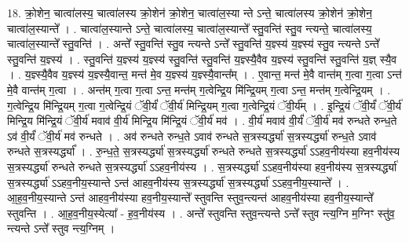 \documentclass[17pt]{extarticle}
\begin{document}
18. क्रो॒शेन॒ चात्वा॑लस्य॒ चात्वा॑लस्य क्रो॒शेन॑ क्रो॒शेन॒ चात्वा॑ल॒स्या न्ते ऽन्ते॒ चात्वा॑लस्य क्रो॒शेन॑ क्रो॒शेन॒ चात्वा॑ल॒स्यान्ते᳚ । . चात्वा॑ल॒स्यान्ते ऽन्ते॒ चात्वा॑लस्य॒ चात्वा॑ल॒स्यान्ते᳚ स्तु॒वन्ति॑ स्तु॒व न्त्यन्ते॒ चात्वा॑लस्य॒ चात्वा॑ल॒स्यान्ते᳚ स्तु॒वन्ति॑ । . अन्ते᳚ स्तु॒वन्ति॑ स्तु॒व न्त्यन्ते ऽन्ते᳚ स्तु॒वन्ति॑ य॒ज्ञ्स्य॑ य॒ज्ञ्स्य॑ स्तु॒व न्त्यन्ते ऽन्ते᳚ स्तु॒वन्ति॑ य॒ज्ञ्स्य॑ । . स्तु॒वन्ति॑ य॒ज्ञ्स्य॑ य॒ज्ञ्स्य॑ स्तु॒वन्ति॑ स्तु॒वन्ति॑ य॒ज्ञ्स्यै॒वैव य॒ज्ञ्स्य॑ स्तु॒वन्ति॑ स्तु॒वन्ति॑ य॒ज्ञ् स्यै॒व । . य॒ज्ञ्स्यै॒वैव य॒ज्ञ्स्य॑ य॒ज्ञ्स्यै॒वान्त॒ मन्त॑ मे॒व य॒ज्ञ्स्य॑ य॒ज्ञ्स्यै॒वान्त᳚म् । . ए॒वान्त॒ मन्त॑ मे॒वै वान्त॑म् ग॒त्वा ग॒त्वा ऽन्त॑ मे॒वै वान्त॑म् ग॒त्वा । . अन्त॑म् ग॒त्वा ग॒त्वा ऽन्त॒ मन्त॑म् ग॒त्वेन्द्रि॒य मि॑न्द्रि॒यम् ग॒त्वा ऽन्त॒ मन्त॑म् ग॒त्वेन्द्रि॒यम् । . ग॒त्वेन्द्रि॒य मि॑न्द्रि॒यम् ग॒त्वा ग॒त्वेन्द्रि॒यं ॅवी॒र्यं॑ ॅवी॒र्य॑ मिन्द्रि॒यम् ग॒त्वा ग॒त्वेन्द्रि॒यं ॅवी॒र्य᳚म् । . इ॒न्द्रि॒यं ॅवी॒र्यं॑ ॅवी॒र्य॑ मिन्द्रि॒य मि॑न्द्रि॒यं ॅवी॒र्य॑ मवाव॑ वी॒र्य॑ मिन्द्रि॒य मि॑न्द्रि॒यं ॅवी॒र्य॑ मव॑ । . वी॒र्य॑ मवाव॑ वी॒र्यं॑ ॅवी॒र्य॑ मव॑ रुन्धते रुन्ध॒ते ऽव॑ वी॒र्यं॑ ॅवी॒र्य॑ मव॑ रुन्धते । . अव॑ रुन्धते रुन्ध॒ते ऽवाव॑ रुन्धते स॒त्रस्यर्द्ध्या॑ स॒त्रस्यर्द्ध्या॑ रुन्ध॒ते ऽवाव॑ रुन्धते स॒त्रस्यर्द्ध्या᳚ । . रु॒न्ध॒ते॒ स॒त्रस्यर्द्ध्या॑ स॒त्रस्यर्द्ध्या॑ रुन्धते रुन्धते स॒त्रस्यर्द्ध्या॑ ऽऽहव॒नीय॑स्या हव॒नीय॑स्य स॒त्रस्यर्द्ध्या॑ रुन्धते रुन्धते स॒त्रस्यर्द्ध्या॑ ऽऽहव॒नीय॑स्य । . स॒त्रस्यर्द्ध्या॑ ऽऽहव॒नीय॑स्या हव॒नीय॑स्य स॒त्रस्यर्द्ध्या॑ स॒त्रस्यर्द्ध्या॑ ऽऽहव॒नीय॒स्यान्ते ऽन्त॑ आहव॒नीय॑स्य स॒त्रस्यर्द्ध्या॑ स॒त्रस्यर्द्ध्या॑ ऽऽहव॒नीय॒स्यान्ते᳚ । . आ॒ह॒व॒नीय॒स्यान्ते ऽन्त॑ आहव॒नीय॑स्या हव॒नीय॒स्यान्ते᳚ स्तुवन्ति स्तुव॒न्त्यन्त॑ आहव॒नीय॑स्या हव॒नीय॒स्यान्ते᳚ स्तुवन्ति । . आ॒ह॒व॒नीय॒स्येत्या᳚ - ह॒व॒नीय॑स्य । . अन्ते᳚ स्तुवन्ति स्तुव॒न्त्यन्ते ऽन्ते᳚ स्तुव न्त्य॒ग्नि म॒ग्निꣳ स्तु॑व॒ न्त्यन्ते ऽन्ते᳚ स्तुव न्त्य॒ग्निम् । \newline
\end{document}
